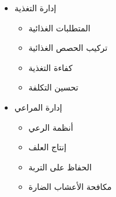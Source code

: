 \begin{itemize}
\begin{itemize}
        \item إدارة التغذية
        \begin{itemize}
            \item المتطلبات الغذائية
            \item تركيب الحصص الغذائية
            \item كفاءة التغذية
            \item تحسين التكلفة
        \end{itemize}
        
        \item إدارة المراعي
        \begin{itemize}
            \item أنظمة الرعي
            \item إنتاج العلف
            \item الحفاظ على التربة
            \item مكافحة الأعشاب الضارة
        \end{itemize}
    \end{itemize}
\end{itemize}

